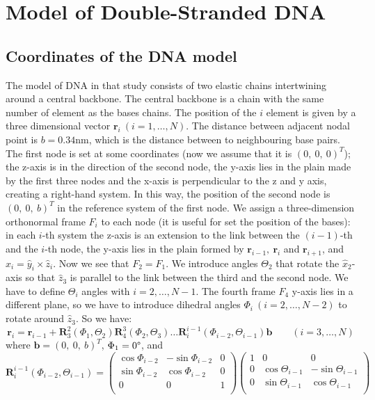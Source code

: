 \documentclass[a4paper,10pt]{article}
\begin{document}
\section{Model of Double-Stranded DNA}
\subsection{Coordinates of the DNA model}
The model of DNA in that study consists of two elastic chains intertwining around a central backbone.
The central backbone is a chain with the same number of element as the bases chains.
The position of the $i$ element is given by a three dimensional vector $\textbf{r}_i \ \left(i=1,\dots ,N\right)$.
The distance between adjacent nodal point is $b = 0.34$\si{\nm}, which is the distance between to neighbouring base pairs.
The first node is set at some coordinates (now we assume that it is $(0,\ 0,\ 0)^T$);
the z-axis is in the direction of the second node, the y-axis lies in the plain made by the first three nodes and the x-axis is perpendicular to the z and y axis, creating a right-hand system.
In this way, the position of the second node is $(0,\ 0,\ b)^T$ in the reference system of the first node.
We assign a three-dimension orthonormal frame $F_i$ to each node (it is useful for set the position of the bases): in each $i$-th system the z-axis is an extension to the link between the $\left (i-1\right )$-th and the $i$-th node, the y-axis lies in the plain formed by $\textbf{r}_{i-1},\ \textbf{r}_i$ and $\textbf{r}_{i+1}$, and $\hat{x}_i=\hat{y}_i\times\hat{z}_i$.
Now we see that $F_2=F_1$.
We introduce angles $\Theta_2$ that rotate the $\hat{x}_2$-axis so that $\hat{z}_3$ is parallel to the link between the third and the second node.
We have to define $\Theta_i$ angles with $i=2,\dots,N-1$.
The fourth frame $F_4$ y-axis lies in a different plane, so we have to introduce dihedral angles $\Phi_i\ (i=2,\dots,N-2)$ to rotate around $\hat{z}_3$.
So we have:
\begin{equation}\label{eq:c_coo}
\textbf{r}_i=\textbf{r}_{i-1}+\textbf{R}^{2}_{3}\left(\Phi_1,\Theta_2\right)\textbf{R}^{3}_{4}\left(\Phi_2,\Theta_3\right)\dots\textbf{R}^{i-1}_{i}\left(\Phi_{i-2},\Theta_{i-1}\right)\textbf{b}\qquad (i=3,\dots,N)
\end{equation}
where $\textbf{b}=(0,\ 0,\ b)^T$, $\Phi_1=0\degree$, and
\begin{equation}\label{eq:r_matrix}
\textbf{R}^{i-1}_{i}\left(\Phi_{i-2},\Theta_{i-1}\right)=
\begin{pmatrix}
\cos\Phi_{i-2} & -\sin\Phi_{i-2} & 0 \\
\sin\Phi_{i-2} & \cos\Phi_{i-2} & 0 \\
0 & 0 & 1 \\
\end{pmatrix}
\begin{pmatrix}
1 & 0 & 0 \\
0 & \cos\Theta_{i-1} & -\sin\Theta_{i-1} \\
0 & \sin\Theta_{i-1} & \cos\Theta_{i-1} \\
\end{pmatrix}
\end{equation}
\end{document}
